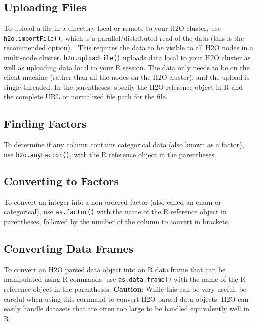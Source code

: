 {{\waterExampleInR
\medskip


\subsection{Uploading Files}

To upload a file in a directory local or remote to your H2O cluster, use {\texttt{h2o.importFile()}}, which is a parallel/distributed read of the data (this is the recommended option).  This requires the data to be visible to all H2O nodes in a multi-node cluster. {\texttt{h2o.uploadFile()}} uploads data local to your H2O cluster as well as uploading data local to your R session. The data only needs to be on the client machine (rather than all the nodes on the H2O cluster), and the upload is single threaded. In the parentheses, specify the H2O reference object in R and the complete URL or normalized file path for the file.


\waterExampleInR
\medskip



\subsection{Finding Factors}
To determine if any column contains categorical data (also known as a factor), use {\texttt{h2o.anyFactor()}}, with the R reference object in the parentheses.

\waterExampleInR
\medskip


\subsection{Converting to Factors}
To convert an integer into a non-ordered factor (also called an enum or categorical), use {\texttt{as.factor()}} with the name of the R reference object in parentheses, followed by the number of the column to convert in brackets.

\waterExampleInR
\medskip


\subsection{Converting Data Frames}

To convert an H2O parsed data object into an R data frame that can be manipulated using R commands, use {\texttt{as.data.frame()}} with the name of the R reference object in the parentheses.
{\textbf{Caution}}: While this can be very useful, be careful when using this command to convert H2O parsed data objects. H2O can easily handle datasets that are often too large to be handled equivalently well in R.

}}
